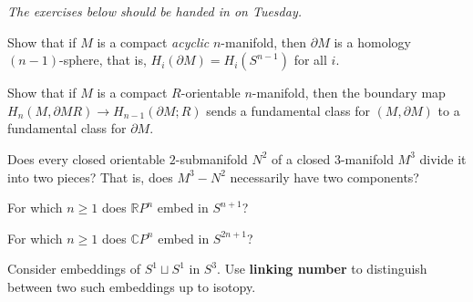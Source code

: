 \documentclass[12pt]{pset}
\author{Jim Fowler}
\date{Spring 2012}
\newcommand{\CP}{\mathbb{C}P}
\newcommand{\RP}{\mathbb{R}P}
\begin{document}
\maketitle

\noindent\textit{The exercises below should be handed in on Tuesday.}

\begin{problem}
  Show that if $M$ is a compact \textit{acyclic} $n$-manifold, then
  $\partial M$ is a homology $(n-1)$-sphere, that is, $H_i(\partial M)
  = H_i(S^{n-1})$ for all $i$.
\end{problem}

\begin{problem}
  Show that if $M$ is a compact $R$-orientable $n$-manifold, then the
  boundary map $H_n(M,\partial MR) \to H_{n-1}(\partial M;R)$ sends a
  fundamental class for $(M,\partial M)$ to a fundamental class for
  $\partial M$.
\end{problem}

\begin{problem}
  Does every closed orientable $2$-submanifold $N^2$ of a closed
  $3$-manifold $M^3$ divide it into two pieces?  That is, does $M^3 -
  N^2$ necessarily have two components?
\end{problem}

\begin{problem}
  For which $n \geq 1$ does $\RP^n$ embed in $S^{n+1}$?
\end{problem}

\begin{problem}
  For which $n \geq 1$ does $\CP^n$ embed in $S^{2n+1}$?
\end{problem}

\begin{problem}
  Consider embeddings of $S^1 \sqcup S^1$ in $S^3$.  Use
  \textbf{linking number} to distinguish between two such embeddings
  up to isotopy.
\end{problem}

\pagebreak
\null
\end{document}
